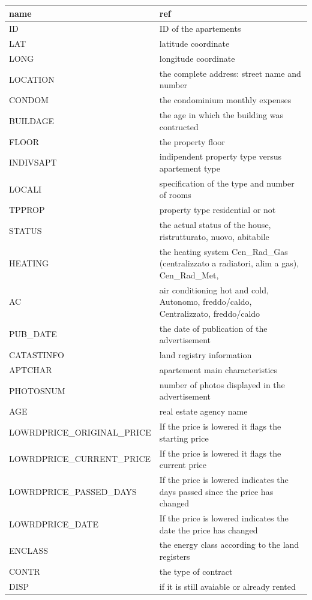 \documentclass[
  12pt,
  a4paper,
  oneside]{book}
\theoremstyle{definition}
\theoremstyle{definition}
\theoremstyle{definition}
\theoremstyle{remark}
\begin{document}
\begin{longtable}{ll}
\toprule
name & ref\\
\midrule
ID & ID of the apartements\\
LAT & latitude coordinate\\
LONG & longitude coordinate\\
LOCATION & the complete address: street name and number\\
CONDOM & the condominium monthly expenses\\
\addlinespace
BUILDAGE & the age in which the building was contructed\\
FLOOR & the property floor\\
INDIVSAPT & indipendent property type versus apartement type\\
LOCALI & specification of the type and number of rooms\\
TPPROP & property type residential or not\\
\addlinespace
STATUS & the actual status of the house, ristrutturato, nuovo, abitabile\\
HEATING & the heating system Cen\_Rad\_Gas (centralizzato a radiatori, alim a gas), Cen\_Rad\_Met,\\
AC & air conditioning hot and cold, Autonomo, freddo/caldo, Centralizzato, freddo/caldo\\
PUB\_DATE & the date of publication of the advertisement\\
CATASTINFO & land registry information\\
\addlinespace
APTCHAR & apartement main characteristics\\
PHOTOSNUM & number of photos displayed in the advertisement\\
AGE & real estate agency name\\
LOWRDPRICE\_ORIGINAL\_PRICE & If the price is lowered it flags the starting price\\
LOWRDPRICE\_CURRENT\_PRICE & If the price is lowered it flags the current price\\
\addlinespace
LOWRDPRICE\_PASSED\_DAYS & If the price is lowered indicates the days passed since the price has changed\\
LOWRDPRICE\_DATE & If the price is lowered indicates the date the price has changed\\
ENCLASS & the energy class according to the land registers\\
CONTR & the type of contract\\
DISP & if it is still avaiable or already rented\\

\end{longtable}
\end{document}
